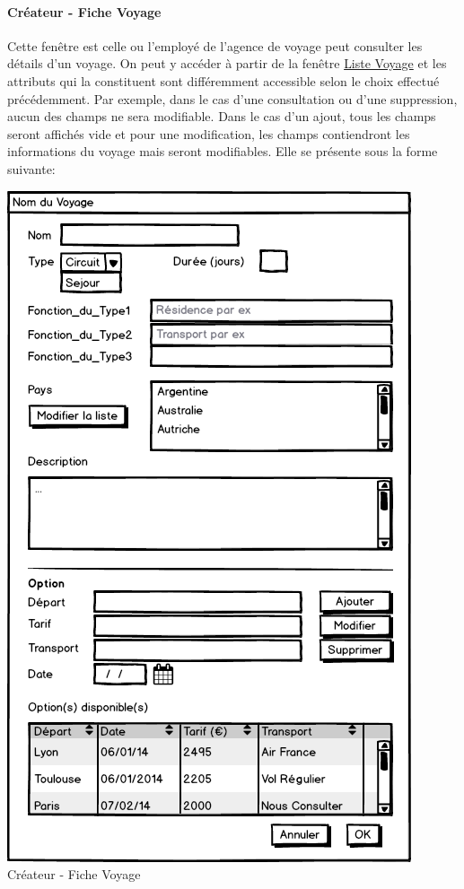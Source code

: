 \documentclass[11pt]{article}
\begin{document}
\paragraph{Créateur - Fiche Voyage}
Cette fenêtre est celle ou l'employé de l'agence de voyage peut consulter les détails d'un voyage. On peut y accéder à partir de la fenêtre \hyperref[fig:Cr-Liste_Voyage]{Liste Voyage} et les attributs qui la constituent sont différemment accessible selon le choix effectué précédemment. Par exemple, dans le cas d'une consultation ou d'une suppression, aucun des champs ne sera modifiable. Dans le cas d'un ajout, tous les champs seront affichés vide et pour une modification, les champs contiendront les informations du voyage mais seront modifiables. Elle se présente sous la forme suivante:
\begin{center}
\includegraphics[scale = 0.5]{../Conception_graphique/png_Pour_CR/Createur-30-Fiche_Voyage.png}
\newline
Créateur - Fiche Voyage
\label{fig:Cr-Fiche Voyage}
\end{center}
\end{document}
